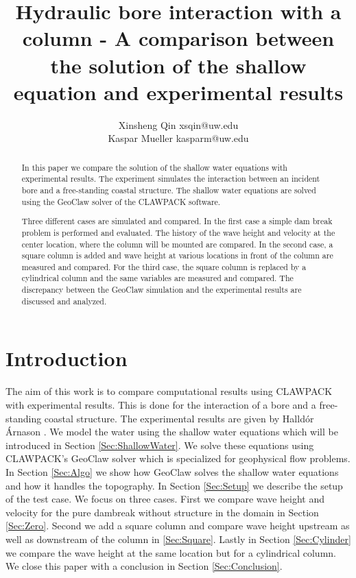 \documentclass[11pt]{article}
\title{Hydraulic bore interaction with a column - A comparison between the solution of the shallow equation and experimental results}
\author{Xinsheng Qin xsqin@uw.edu\\
        Kaspar Mueller kasparm@uw.edu}
\begin{document}
\maketitle

\begin{abstract}
In this paper we compare the solution of the shallow water equations with experimental results. The experiment simulates the interaction between an incident bore and a free-standing coastal structure. The shallow water equations are solved using the GeoClaw solver of the CLAWPACK software.
\par
Three different cases are simulated and compared. In the first case a simple dam break problem is performed and evaluated.
The history of the wave height and velocity at the center location, where the column will be mounted are compared. 
In the second case, a square column is added and wave height at various locations in front of the column are measured and compared. 
For the third case, the square column is replaced by a cylindrical column and the same variables are measured and compared. 
The discrepancy between the GeoClaw simulation and the experimental results are discussed and analyzed.
\end{abstract}

\section{Introduction}\label{Sec:intro}
The aim of this work is to compare computational results using CLAWPACK with experimental results. This is done for the interaction of a bore and a free-standing coastal structure. The experimental results are given by Halld\'or \'Arnason \cite{HA}. We model the water using the shallow water equations which will be introduced in Section \ref{Sec:ShallowWater}. We solve these equations using CLAWPACK's GeoClaw solver which is specialized for geophysical flow problems. In Section \ref{Sec:Algo} we show how GeoClaw solves the shallow water equations and how it handles the topography. In Section \ref{Sec:Setup} we describe the setup of the test case. We focus on three cases. First we compare wave height and velocity for the pure dambreak without structure in the domain in Section \ref{Sec:Zero}. Second we add a square column and compare wave height upstream as well as downstream of the column in \ref{Sec:Square}. Lastly in Section \ref{Sec:Cylinder} we compare the wave height at the same location but for a cylindrical column. We close this paper with a conclusion in Section \ref{Sec:Conclusion}.
\end{document}
